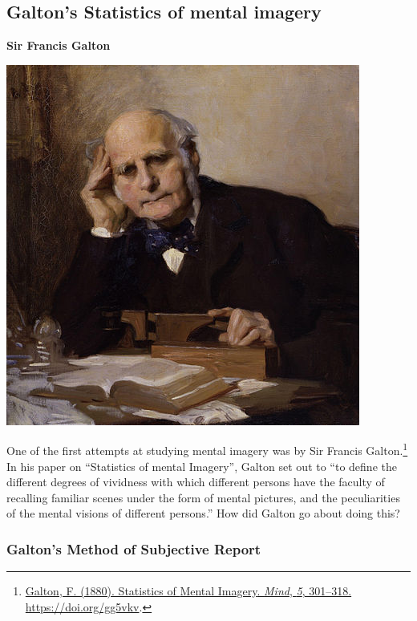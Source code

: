 \documentclass[
  oneside,
  12pt]{crumpbook}
\newenvironment{floatrightbox25}{%
  \wrapfigure{R}{.25\textwidth}%
  }{%
  \endwrapfigure}
\begin{document}
\hypertarget{galtons-statistics-of-mental-imagery}{%
\subsection{Galton's Statistics of mental imagery}\label{galtons-statistics-of-mental-imagery}}

\begin{floatrightbox25}
\textbf{Sir Francis Galton}

\includegraphics[width=1\linewidth]{imgs/Francis_Galton}

\end{floatrightbox25}

One of the first attempts at studying mental imagery was by Sir Francis Galton.\footnote{\protect\hyperlink{ref-galtonStatisticsMentalImagery1880}{Galton, F. (1880). Statistics of {Mental Imagery}. \emph{Mind}, \emph{5}, 301--318. \url{https://doi.org/gg5vkv}}.} In his paper on ``Statistics of mental Imagery'', Galton set out to ``to define the different degrees of vividness with which different persons have the faculty of recalling familiar scenes under the form of mental pictures, and the peculiarities of the mental visions of different persons.'' How did Galton go about doing this?

\hypertarget{galtons-method-of-subjective-report}{%
\subsubsection{Galton's Method of Subjective Report}\label{galtons-method-of-subjective-report}}
\end{document}

